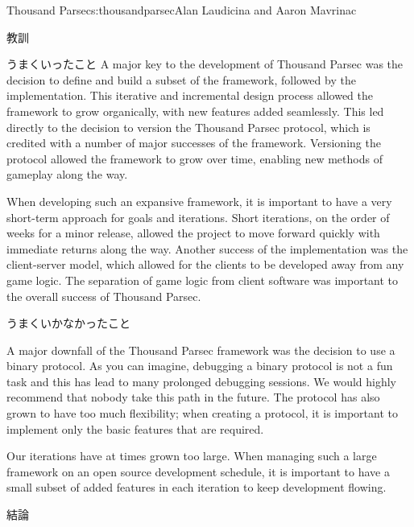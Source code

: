 \begin{aosachapter}{Thousand Parsec}{s:thousandparsec}{Alan Laudicina and Aaron Mavrinac}
\begin{aosasect1}{教訓}
\begin{aosasect2}{うまくいったこと}
A major key to the development of Thousand Parsec was the decision to
define and build a subset of the framework, followed by the
implementation. This iterative and incremental design process allowed
the framework to grow organically, with new features added
seamlessly. This led directly to the decision to version the
Thousand Parsec protocol, which is credited with a number of major
successes of the framework. Versioning the protocol allowed the
framework to grow over time, enabling new methods of gameplay along
the way.

When developing such an expansive framework, it is important to have a
very short-term approach for goals and iterations. Short iterations, on the order of weeks for a minor release,
allowed the project to move forward quickly with immediate returns
along the way. Another success of the
implementation was the client-server model, which allowed for the
clients to be developed away from any game logic. The separation of
game logic from client software was important to the overall success
of Thousand Parsec.

\end{aosasect2}

\begin{aosasect2}{うまくいかなかったこと}

A major downfall of the Thousand Parsec framework was the decision to
use a binary protocol. As you can imagine, debugging a binary protocol
is not a fun task and this has lead to many prolonged debugging
sessions. We would highly recommend that nobody take this path in the
future. The protocol has also grown to have too much flexibility; when
creating a protocol, it is important to implement only the basic
features that are required.

Our iterations have at times grown too large. When managing such a
large framework on an open source development schedule, it is
important to have a small subset of added features in each iteration
to keep development flowing.

\end{aosasect2}

\begin{aosasect2}{結論}


\end{aosasect2}
\end{aosasect1}
\end{aosachapter}
